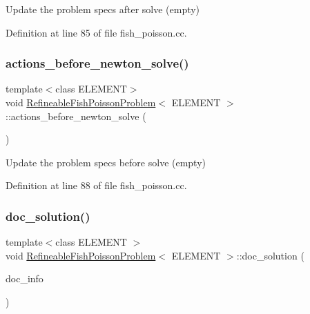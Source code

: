 Update the problem specs after solve (empty) 



Definition at line 85 of file fish\+\_\+poisson.\+cc.

\mbox{\label{classRefineableFishPoissonProblem_a58098181f3b88c2fc65f24fb15c1a529}} 
\subsubsection{\texorpdfstring{actions\+\_\+before\+\_\+newton\+\_\+solve()}{actions\_before\_newton\_solve()}}
{\footnotesize\ttfamily template$<$class E\+L\+E\+M\+E\+NT$>$ \\
void \hyperlink{classRefineableFishPoissonProblem}{Refineable\+Fish\+Poisson\+Problem}$<$ E\+L\+E\+M\+E\+NT $>$\+::actions\+\_\+before\+\_\+newton\+\_\+solve (\begin{DoxyParamCaption}{ }\end{DoxyParamCaption})\hspace{0.3cm}{\ttfamily [inline]}}



Update the problem specs before solve (empty) 



Definition at line 88 of file fish\+\_\+poisson.\+cc.

\mbox{\label{classRefineableFishPoissonProblem_aeee1bf23216971b50b8822c45e62c48b}} 
\subsubsection{\texorpdfstring{doc\+\_\+solution()}{doc\_solution()}}
{\footnotesize\ttfamily template$<$class E\+L\+E\+M\+E\+NT $>$ \\
void \hyperlink{classRefineableFishPoissonProblem}{Refineable\+Fish\+Poisson\+Problem}$<$ E\+L\+E\+M\+E\+NT $>$\+::doc\+\_\+solution (\begin{DoxyParamCaption}\item[{Doc\+Info \&}]{doc\+\_\+info }\end{DoxyParamCaption})}



